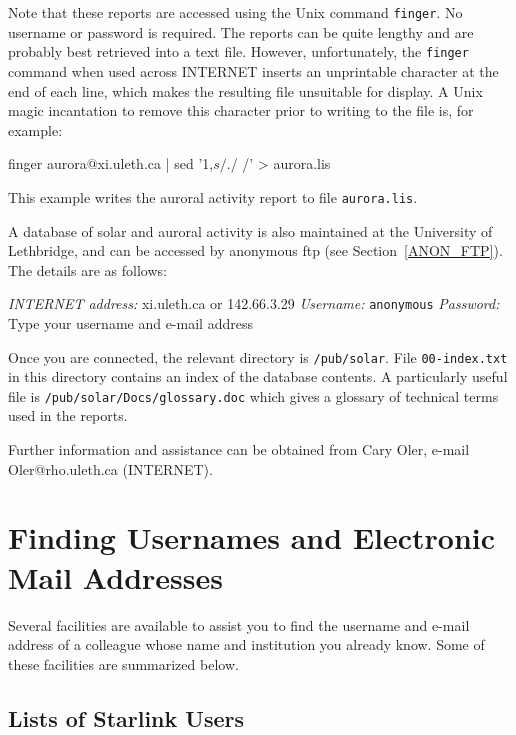 \documentclass[twoside,11pt,nolof]{starlink}
\begin{document}
Note that these reports are accessed using the Unix command \texttt{finger}. No username or password is required. The reports can be
quite lengthy and are probably best retrieved into a text file.
However, unfortunately, the \texttt{finger} command when used across
INTERNET inserts an unprintable character at the end of each line, which
makes the resulting file unsuitable for display. A Unix magic
incantation to remove this character prior to writing to the file
is, for example:

\begin{terminalv}
finger aurora@xi.uleth.ca | sed '1,$s/.$/ /' > aurora.lis
\end{terminalv}

This example writes the auroral activity report to file \texttt{aurora.lis}.

A database of solar and auroral activity is also maintained at the
University of Lethbridge, and can be accessed by anonymous ftp (see
Section~\ref{ANON_FTP}). The details  are as follows:

\textit{INTERNET address:} xi.uleth.ca or 142.66.3.29
\newline \textit{Username:} \verb-anonymous-
\newline \textit{Password:} Type your username and e-mail address

Once you are connected, the relevant directory is \texttt{/pub/solar}.
File \texttt{00-index.txt} in this directory contains an index of the
database contents. A particularly useful file is
\newline \texttt{/pub/solar/Docs/glossary.doc} which gives a glossary of
technical terms used in the reports.

Further information and assistance can be obtained from Cary Oler,
e-mail Oler@rho.uleth.ca (INTERNET).


\section{Finding Usernames and Electronic Mail Addresses
}

Several facilities are available to assist you to find the username and
e-mail address of a colleague whose name and institution you already
know. Some of these facilities are summarized below.

\subsection{Lists of Starlink Users}
\end{document}
